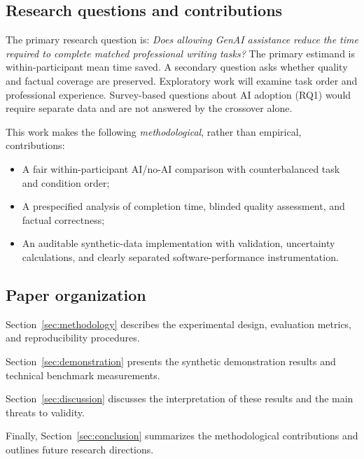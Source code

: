 \subsection{Research questions and contributions}
The primary research question is: \emph{Does allowing GenAI assistance reduce the time required to complete matched professional writing tasks?} The primary estimand is within-participant mean time saved. A secondary question asks whether quality and factual coverage are preserved. Exploratory work will examine task order and professional experience. Survey-based questions about AI adoption (RQ1) would require separate data and are not answered by the crossover alone.

This work makes the following \emph{methodological}, rather than empirical, contributions:
\begin{itemize}
  \item A fair within-participant AI/no-AI comparison with counterbalanced task and condition order;
  \item A prespecified analysis of completion time, blinded quality assessment, and factual correctness;
  \item An auditable synthetic-data implementation with validation, uncertainty calculations, and clearly separated software-performance instrumentation.
\end{itemize}

\subsection{Paper organization}

Section~\ref{sec:methodology} describes the
experimental design, evaluation metrics, and
reproducibility procedures.

Section~\ref{sec:demonstration} presents the
synthetic demonstration results and technical
benchmark measurements.

Section~\ref{sec:discussion} discusses the
interpretation of these results and the main
threats to validity.

Finally, Section~\ref{sec:conclusion}
summarizes the methodological contributions
and outlines future research directions.
